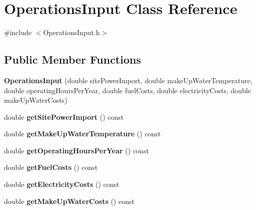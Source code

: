 \hypertarget{class_operations_input}{}\section{Operations\+Input Class Reference}
\label{class_operations_input}


{\ttfamily \#include $<$Operations\+Input.\+h$>$}

\subsection*{Public Member Functions}
\begin{DoxyCompactItemize}
\item 
\mbox{\label{class_operations_input_ad22e756e5da663c76dbf4f5e80125f7a}} 
{\bfseries Operations\+Input} (double site\+Power\+Import, double make\+Up\+Water\+Temperature, double operating\+Hours\+Per\+Year, double fuel\+Costs, double electricity\+Costs, double make\+Up\+Water\+Costs)
\item 
\mbox{\label{class_operations_input_a72b75b4504bbba6aace018f5e78f3939}} 
double {\bfseries get\+Site\+Power\+Import} () const
\item 
\mbox{\label{class_operations_input_a73ed7e6f975db188d5b9bae97b96d411}} 
double {\bfseries get\+Make\+Up\+Water\+Temperature} () const
\item 
\mbox{\label{class_operations_input_a31e46749b9d8cad72bd13ee647863b0f}} 
double {\bfseries get\+Operating\+Hours\+Per\+Year} () const
\item 
\mbox{\label{class_operations_input_a7d73c641f00eefc18c10cf3dd79299ef}} 
double {\bfseries get\+Fuel\+Costs} () const
\item 
\mbox{\label{class_operations_input_a9e52d266627b127cbc8ff4d00f5d379b}} 
double {\bfseries get\+Electricity\+Costs} () const
\item 
\mbox{\label{class_operations_input_a32694bb1719f4cb889c14ec61fac914f}} 
double {\bfseries get\+Make\+Up\+Water\+Costs} () const
\item 

\end{DoxyCompactItemize}
